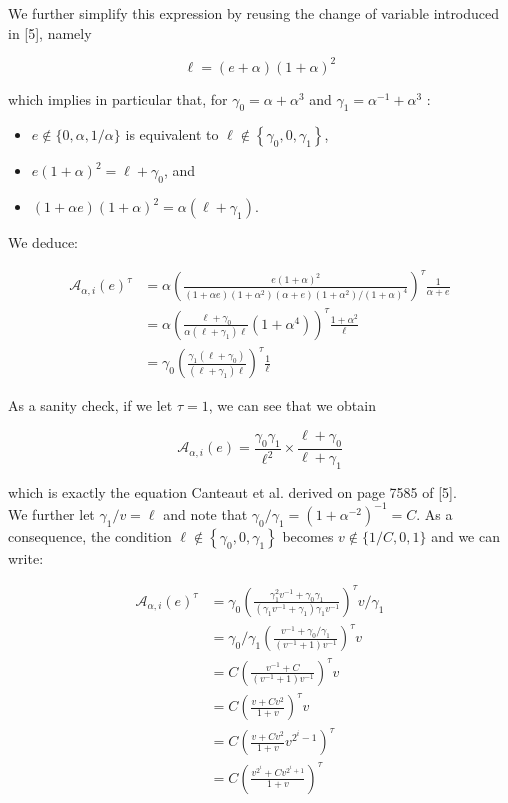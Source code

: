 \documentclass[10pt]{article}
\begin{document}
We further simplify this expression by reusing the change of variable introduced in [5], namely

$$
\ell=(e+\alpha)(1+\alpha)^{2}
$$

which implies in particular that, for $\gamma_{0}=\alpha+\alpha^{3}$ and $\gamma_{1}=\alpha^{-1}+\alpha^{3}$ :

\begin{itemize}
  \item $e \notin\{0, \alpha, 1 / \alpha\}$ is equivalent to $\ell \notin\left\{\gamma_{0}, 0, \gamma_{1}\right\}$,
  \item $e(1+\alpha)^{2}=\ell+\gamma_{0}$, and
  \item $(1+\alpha e)(1+\alpha)^{2}=\alpha\left(\ell+\gamma_{1}\right)$.
\end{itemize}

We deduce:

$$
\begin{aligned}
\mathcal{A}_{\alpha, i}(e)^{\tau} & =\alpha\left(\frac{e(1+\alpha)^{2}}{(1+\alpha e)\left(1+\alpha^{2}\right)(\alpha+e)\left(1+\alpha^{2}\right) /(1+\alpha)^{4}}\right)^{\tau} \frac{1}{\alpha+e} \\
& =\alpha\left(\frac{\ell+\gamma_{0}}{\alpha\left(\ell+\gamma_{1}\right) \ell}\left(1+\alpha^{4}\right)\right)^{\tau} \frac{1+\alpha^{2}}{\ell} \\
& =\gamma_{0}\left(\frac{\gamma_{1}\left(\ell+\gamma_{0}\right)}{\left(\ell+\gamma_{1}\right) \ell}\right)^{\tau} \frac{1}{\ell}
\end{aligned}
$$

As a sanity check, if we let $\tau=1$, we can see that we obtain

$$
\mathcal{A}_{\alpha, i}(e)=\frac{\gamma_{0} \gamma_{1}}{\ell^{2}} \times \frac{\ell+\gamma_{0}}{\ell+\gamma_{1}}
$$

which is exactly the equation Canteaut et al. derived on page 7585 of [5].\\
We further let $\gamma_{1} / v=\ell$ and note that $\gamma_{0} / \gamma_{1}=\left(1+\alpha^{-2}\right)^{-1}=C$. As a consequence, the condition $\ell \notin\left\{\gamma_{0}, 0, \gamma_{1}\right\}$ becomes $v \notin\{1 / C, 0,1\}$ and we can write:

$$
\begin{aligned}
\mathcal{A}_{\alpha, i}(e)^{\tau} & =\gamma_{0}\left(\frac{\gamma_{1}^{2} v^{-1}+\gamma_{0} \gamma_{1}}{\left(\gamma_{1} v^{-1}+\gamma_{1}\right) \gamma_{1} v^{-1}}\right)^{\tau} v / \gamma_{1} \\
& =\gamma_{0} / \gamma_{1}\left(\frac{v^{-1}+\gamma_{0} / \gamma_{1}}{\left(v^{-1}+1\right) v^{-1}}\right)^{\tau} v \\
& =C\left(\frac{v^{-1}+C}{\left(v^{-1}+1\right) v^{-1}}\right)^{\tau} v \\
& =C\left(\frac{v+C v^{2}}{1+v}\right)^{\tau} v \\
& =C\left(\frac{v+C v^{2}}{1+v} v^{2^{i}-1}\right)^{\tau} \\
& =C\left(\frac{v^{2^{i}}+C v^{2^{i}+1}}{1+v}\right)^{\tau}
\end{aligned}
$$
\end{document}
